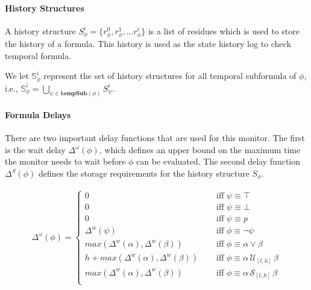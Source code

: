 \documentclass[]{../llncs/llncs}
\begin{document}
\paragraph{History Structures}
A history structure $S_{\phi}^i = \{ r_{\phi}^0, r_{\phi}^1, \ldots r_{\phi}^i \}$ is a list of residues which is used to store the history of a formula. This history is used as the state history log to check temporal formula. 

We let $\mathbb{S}^i_{\phi}$ represent the set of history structures for all temporal subformula of $\phi$, i.e., $\mathbb{S}^i_{\phi} = \bigcup_{\psi \in \mathbf{tempSub}(\phi)} S^i_{\psi}$.

\paragraph{Formula Delays}
There are two important delay functions that are used for this monitor. The first is the wait delay $\Delta^{\omega}(\phi)$, which defines an upper bound on the maximum time the monitor needs to wait before $\phi$ can be evaluated.
%
The second delay function $\Delta^{S}(\phi)$ defines the storage requirements for the history structure $S_\phi$.


\begin{align*}
\Delta^{\omega}(\phi) = \left\lbrace
\begin{aligned}
0 & \quad \text{ iff } \psi \equiv \top \\
0 & \quad \text{ iff } \psi \equiv \bot \\
0 & \quad \text{ iff } \psi \equiv p \\
\Delta^w(\psi) & \quad \text{ iff } \phi \equiv \neg \psi \\
max(\Delta^w(\alpha),\Delta^w(\beta)) & \quad \text{ iff } \phi \equiv \alpha \vee \beta \\
h + max(\Delta^w(\alpha),\Delta^w(\beta)) & \quad \text{ iff } \phi \equiv \alpha\, \mathcal{U}_{[l,h]}\, \beta \\
max(\Delta^w(\alpha),\Delta^w(\beta)) & \quad \text{ iff } \phi \equiv \alpha\, \mathcal{S}_{[l,h]}\, \beta \\
\end{aligned} \right. 
\end{align*}
\end{document}
